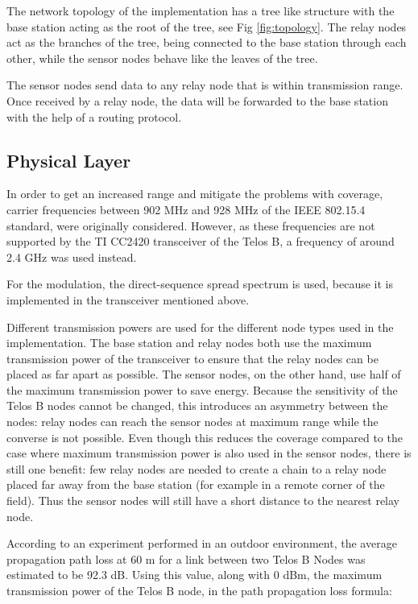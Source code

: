 \documentclass[conference]{IEEEtran}
\begin{document}
The network topology of the implementation has a tree like structure with
the base station acting as the root of the tree, see Fig \ref{fig:topology}.
The relay nodes act as the branches of the tree, being connected to the base
station through each other, while the sensor nodes behave like the leaves of
the tree.

The sensor nodes send data to any relay node that is within transmission range.
Once received by a relay node, the data will be forwarded to the base station
with the help of a routing protocol.

\subsection{Physical Layer}

In order to get an increased range and mitigate the problems with coverage,
carrier frequencies between 902 MHz and 928 MHz of the IEEE 802.15.4 standard,
were originally considered. However, as these frequencies are not supported by
the TI CC2420 transceiver of the Telos B, a frequency of around 2.4 GHz was
used instead.

For the modulation, the direct-sequence spread spectrum is used, because it is
implemented in the transceiver mentioned above.

Different transmission powers are used for the different node types used in the
implementation. The base station and relay nodes both use the maximum
transmission power of the transceiver to ensure that the relay nodes can be
placed as far apart as possible.  The sensor nodes, on the other hand, use half
of the maximum transmission power to save energy. Because the sensitivity of
the Telos B nodes cannot be changed, this introduces an asymmetry between the
nodes: relay nodes can reach the sensor nodes at maximum range while the
converse is not possible.  Even though this reduces the coverage compared to
the case where maximum transmission power is also used in the sensor nodes,
there is still one benefit: few relay nodes are needed to create a chain to
a relay node placed far away from the base station (for example in a remote
corner of the field). Thus the sensor nodes will still have a short distance to
the nearest relay node.

According to an experiment performed in an outdoor environment, the average
propagation path loss at 60 m for a link between two Telos B Nodes was
estimated to be 92.3 dB. Using this value, along with 0 dBm, the maximum
transmission power of the Telos B node, in the path propagation loss formula:
\end{document}
